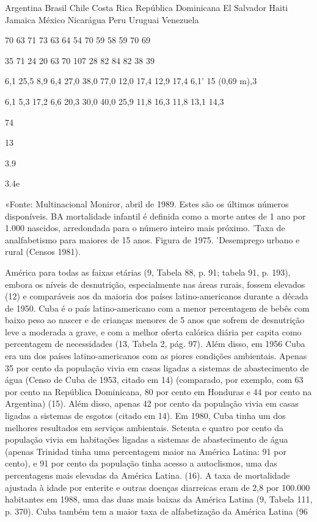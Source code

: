 \documentclass[twocolumn,amsmath,amssymb,aps,pre,floatfix]{revtex4-2}
\begin{document}
\par
Argentina Brasil Chile Costa Rica República Dominicana El Salvador Haiti Jamaica México Nicarágua Peru Uruguai Venezuela
\par
70 63 71 73 63 64 54 70 59 58 59 70 69
\par
35 71 24 20 63 70 107 28 82 84 82 38 39
\par
6,1 25,5 8,9 6,4 27,0 38,0 77,0 12,0 17,4 12,9 17,4 6,1' 15 (0,69 m),3
\par
6,1 5,3 17,2 6,6 20,3 30,0 40,0 25,9 11,8 16,3 11,8 13,1 14,3
\par
74
\par
13
\par
3.9
\par
3.4e
\par
«Fonte: Multinacional Moniror, abril de 1989. Estes são os últimos números disponíveis. BA mortalidade infantil é definida como a morte antes de 1 ano por 1.000 nascidos, arredondada para o número inteiro mais próximo. 'Taxa de analfabetismo para maiores de 15 anos. Figura de 1975. 'Desemprego urbano e rural (Censos 1981).
\par
América para todas as faixas etárias (9, Tabela 88, p. 91; tabela 91, p. 193), embora os níveis de desnutrição, especialmente nas áreas rurais, fossem elevados (12) e comparáveis ​​aos da maioria dos países latino-americanos durante a década de 1950. Cuba é o país latino-americano com a menor percentagem de bebês com baixo peso ao nascer e de crianças menores de 5 anos que sofrem de desnutrição leve a moderada a grave, e com a melhor oferta calórica diária per capita como percentagem de necessidades (13, Tabela 2, pág. 97). Além disso, em 1956 Cuba era um dos países latino-americanos com as piores condições ambientais. Apenas 35 por cento da população vivia em casas ligadas a sistemas de abastecimento de água (Censo de Cuba de 1953, citado em 14) (comparado, por exemplo, com 63 por cento na República Dominicana, 80 por cento em Honduras e 44 por cento na Argentina) (15). Além disso, apenas 42 por cento da população vivia em casas ligadas a sistemas de esgotos (citado em 14). Em 1980, Cuba tinha um dos melhores resultados em serviços ambientais. Setenta e quatro por cento da população vivia em habitações ligadas a sistemas de abastecimento de água (apenas Trinidad tinha uma percentagem maior na América Latina: 91 por cento), e 91 por cento da população tinha acesso a autoclismos, uma das percentagens mais elevadas da América Latina. (16). A taxa de mortalidade ajustada à idade por enterite e outras doenças diarreicas eram de 2,8 por 100.000 habitantes em 1988, uma das duas mais baixas da América Latina (9, Tabela 111, p. 370). Cuba também tem a maior taxa de alfabetização da América Latina (96%
\end{document}
